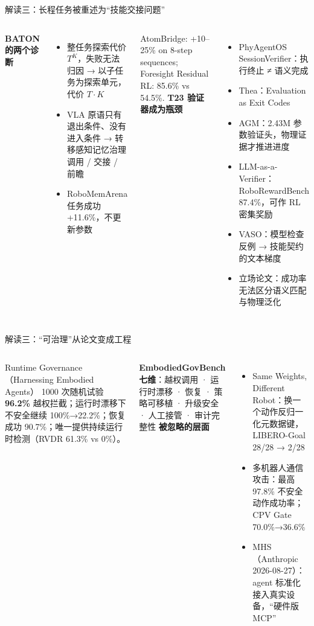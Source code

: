 \documentclass[aspectratio=169,10pt]{beamer}
\newcommand{\en}[1]{{\footnotesize\textcolor{neutral}{#1}}}
\begin{document}
\begin{frame}{解读三：长程任务被重述为“技能交接问题”}
\begin{columns}[T]
\textbf{BATON 的两个诊断}
\begin{itemize}
  \item 整任务探索代价 $T^K$，失败无法归因 → 以子任务为探索单元，代价 $T\cdot K$
  \item VLA 原语只有退出条件、没有进入条件 → 转移感知记忆治理调用 / 交接 / 前瞻
  \item RoboMemArena 任务成功 +11.6\%，不更新参数
\end{itemize}
\en{AtomBridge: +10--25\% on 8-step sequences; Foresight Residual RL: 85.6\% vs 54.5\%.}
\textbf{T23 验证器成为瓶颈}
\begin{itemize}
  \item PhyAgentOS SessionVerifier：执行终止 ≠ 语义完成
  \item Thea：Evaluation as Exit Codes
  \item AGM：2.43M 参数验证头，物理证据才推进进度
  \item LLM-as-a-Verifier：RoboRewardBench 87.4\%，可作 RL 密集奖励
  \item VASO：模型检查反例 → 技能契约的文本梯度
  \item 立场论文：成功率无法区分语义匹配与物理泛化
\end{itemize}
\end{columns}
\end{frame}

\begin{frame}{解读三：“可治理”从论文变成工程}
\begin{columns}[T]
\begin{block}{Runtime Governance（Harnessing Embodied Agents）}
1000 次随机试验 \textbf{96.2\%} 越权拦截；运行时漂移下不安全继续 100\%→22.2\%；恢复成功 90.7\%；唯一提供持续运行时检测（RVDR 61.3\% vs 0\%）。
\end{block}
\textbf{EmbodiedGovBench 七维}：越权调用 · 运行时漂移 · 恢复 · 策略可移植 · 升级安全 · 人工接管 · 审计完整性
\textbf{被忽略的层面}
\begin{itemize}
  \item Same Weights, Different Robot：换一个动作反归一化元数据键，LIBERO-Goal 28/28 → 2/28
  \item 多机器人通信攻击：最高 97.8\% 不安全动作成功率；CPV Gate 70.0\%→36.6\%
  \item MHS（Anthropic 2026-08-27）：agent 标准化接入真实设备，“硬件版 MCP”
\end{itemize}
\end{columns}
\end{frame}
\end{document}
